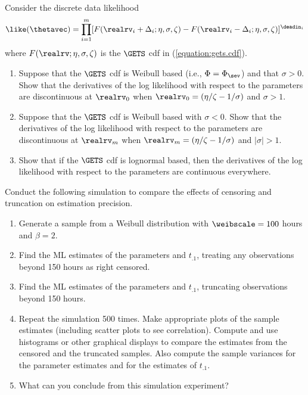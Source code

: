 \begin{exercise1}
Consider the discrete data likelihood
\begin{displaymath}
\like(\thetavec)=\prod_{i=1}^{m} [F(\realrv_{i}+\Delta_{i};\eta,\sigma,\zeta)-
        F(\realrv_{i}-\Delta_{i};\eta,\sigma,\zeta)]^{\deadin_{i}}
\end{displaymath}
where $F(\realrv; \eta,\sigma,\zeta)$ is the $\GETS$ cdf 
in (\ref{equation:gets.cdf}).
\begin{enumerate}
\item
Suppose that the $\GETS$ cdf is Weibull based (i.e.,
$\Phi=\Phi_{\sev}$) and that $\sigma>0$. 
Show that the derivatives of the
log likelihood with respect to the parameters are
discontinuous at $\realrv_{0}$ when 
$\realrv_{0}=(\eta/\zeta-1/\sigma)$ and $\sigma>1$.
\item
Suppose that the $\GETS$ cdf is Weibull based with
$\sigma<0$. 
Show that the derivatives of the
log likelihood with respect to the parameters are
discontinuous at $\realrv_{m}$ when 
$\realrv_{m}=(\eta/\zeta-1/\sigma)$ and $|\sigma|>1$.
\item
Show that if the $\GETS$ cdf is lognormal based,
then the derivatives of the log likelihood
with respect to the parameters are
continuous everywhere.
\end{enumerate}
\end{exercise1}

\begin{exercise2}
\label{exercise:trun.cens.sim}
Conduct the following simulation to compare 
the effects of censoring and truncation on estimation precision.
\begin{enumerate}
\item
Generate a sample from a Weibull distribution with $\weibscale=100$
hours and $\beta=2$.
\item
Find the ML estimates of the
parameters and $t_{.1}$, treating any
observations beyond 150 hours as right censored.
\item
Find the ML estimates of the
parameters and $t_{.1}$, truncating observations beyond 150 hours.
\item
Repeat the simulation 500 times.  Make appropriate plots of the
sample estimates (including scatter plots to see correlation).
Compute and use histograms or other graphical displays to compare
the estimates from the censored and the truncated samples.
Also compute the sample variances for the parameter estimates
and for the estimates of $t_{.1}$.
\item
What can you conclude from this simulation experiment?
\end{enumerate}
\end{exercise2}
